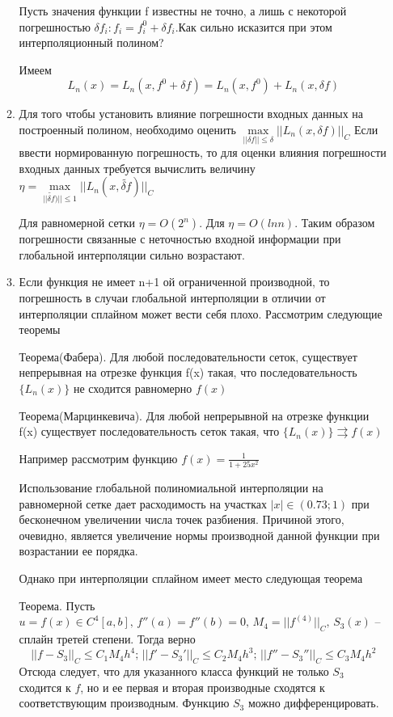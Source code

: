 \documentclass{article}
\begin{document}
\begin{enumerate}
\begin{enumerate}
            
            \noindent Пусть значения функции f известны не точно, а лишь с некоторой погрешностью $\delta f_i: f_i= f_i^0+\delta f_i$.Как сильно исказится при этом интерполяционный полином?
            
            
            \noindent Имеем
            \[
            L_n(x) = L_n(x, f^0+\delta f) = L_n(x, f^0) + L_n(x, \delta f)
            \]
            \item Для того чтобы установить влияние погрешности входных данных на построенный полином, необходимо оценить $\max \limits_{||\delta f|| \le \delta} ||L_n(x, \delta f)||_C$
            Если ввести нормированную погрешность, то для оценки
            влияния погрешности входных данных требуется вычислить
            величину $\eta = \max \limits_{||\widetilde{\delta f})|| \le 1} ||L_n(x, \widetilde{\delta f})||_C$
            
            Для равномерной сетки $\eta=O(2^n)$. Для $\eta = O(lnn)$. Таким образом погрешности связанные с неточностью входной информации при глобальной интерполяции сильно возрастают. 
            \item  Если функция не имеет n+1 ой ограниченной производной, то погрешность в случаи глобальной интерполяции в отличии от интерполяции сплайном может вести себя плохо. Рассмотрим следующие теоремы 
	
	
            Теорема(Фабера). Для любой последовательности сеток, существует непрерывная на отрезке функция f(x) такая, что  последовательность $\{L_n(x)\}$ не сходится равномерно $f(x)$
            
            
            Теорема(Марцинкевича). Для любой непрерывной на отрезке функции f(x) существует последовательность сеток такая, что $\{L_n(x)\} \rightrightarrows f(x)$
            
            Например рассмотрим функцию $f(x) = \frac{1}{1+25x^2}$
            
            Использование глобальной полиномиальной интерполяции на
            равномерной сетке дает расходимость на участках $|x| \in (0.73;1)$ при бесконечном увеличении числа точек разбиения. Причиной этого, очевидно, является увеличение нормы производной данной функции при возрастании ее порядка.
            
            
            Однако при интерполяции сплайном имеет место следующая теорема
            
            
            Теорема. Пусть $u=f(x)\in C^4[a,b],\, f''(a)=f''(b)=0, \, M_4 = ||f^(4)||_C, \, S_3(x)$ -- сплайн третей степени. Тогда верно 
            \[
            ||f-S_3||_C \le C_1 M_4 h^4; \, ||f'-S_3'||_C \le C_2 M_4 h^3; \, ||f''-S_3''||_C \le C_3 M_4 h^2
            \]
            Отсюда следует, что для указанного класса функций не
            только $S_3$ сходится к $f$, но и ее первая и вторая производные сходятся к соответствующим производным. Функцию $S_3$ можно дифференцировать.
        \end{enumerate}
        

\end{enumerate}
\end{document}
